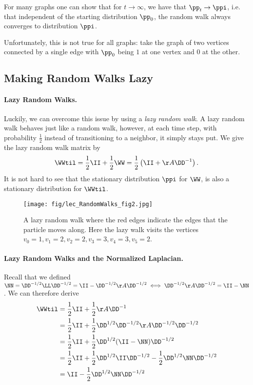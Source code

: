 For many graphs one can show that for $t \to \infty$, we have that $\pp_t \to \ppi$, i.e. that independent of the starting distribution $\pp_0$, the random walk always converges to distribution $\ppi$. 

Unfortunately, this is not true for all graphs: take the graph of two vertices connected by a single edge with $\pp_0$ being $1$ at one vertex and $0$ at the other. 

\subsection{Making Random Walks Lazy}

\paragraph{Lazy Random Walks.} Luckily, we can overcome this issue by using a \emph{lazy random walk}. A lazy random walk behaves just like a random walk, however, at each time step, with probability $\frac{1}{2}$ instead of transitioning to a neighbor, it simply stays put. We give the lazy random walk matrix by
\[
 \WWtil = \frac{1}{2}\II + \frac{1}{2} \WW = \frac{1}{2}\left(\II + \AA \DD^{-1}\right).
\]
It is not hard to see that the stationary distribution $\ppi$ for $\WW$, is also a stationary distribution for $\WWtil$.

\begin{figure}[!ht]
    \centering\label{fig:randomLazyWalkSimple}
    \texttt{[image: fig/lec\_RandomWalks\_fig2.jpg]}
    \caption{A lazy random walk where the red edges indicate the edges that the particle moves along. Here the lazy walk visits the vertices $v_0 = 1, v_1 = 2, v_2 = 2, v_3 = 3, v_4 = 3, v_5 = 2$.}
    \label{fig:my_label}
\end{figure}

\paragraph{Lazy Random Walks and the Normalized Laplacian.} Recall that we defined $\NN = \DD^{-1/2}\LL \DD^{-1/2} = \II - \DD^{-1/2}\AA \DD^{-1/2} \iff \DD^{-1/2}\AA \DD^{-1/2} = \II - \NN$. We can therefore derive
\begin{align*}
    \WWtil &= \frac{1}{2}\II + \frac{1}{2} \AA \DD^{-1}\\
    &= \frac{1}{2}\II + \frac{1}{2} \DD^{1/2}\DD^{-1/2} \AA \DD^{-1/2}\DD^{-1/2}\\
     &= \frac{1}{2}\II + \frac{1}{2} \DD^{1/2}(\II - \NN) \DD^{-1/2}\\
    &= \frac{1}{2}\II + \frac{1}{2} \DD^{1/2}\II \DD^{-1/2} - \frac{1}{2} \DD^{1/2}\NN \DD^{-1/2}\\
    &= \II - \frac{1}{2} \DD^{1/2}\NN \DD^{-1/2}
\end{align*}


